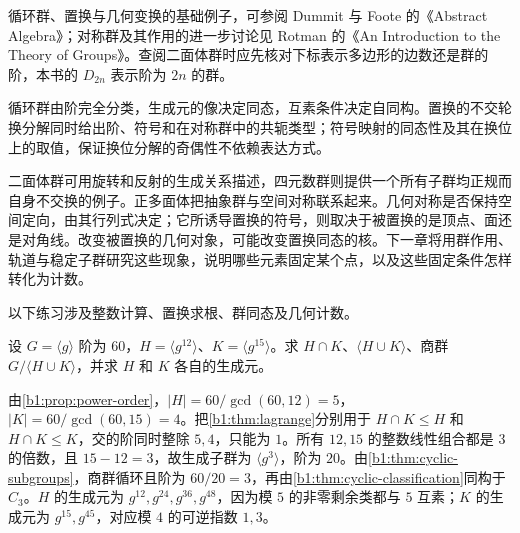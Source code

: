\ProseParagraphBreak
循环群、置换与几何变换的基础例子，可参阅 Dummit 与 Foote 的《Abstract Algebra》\cite[Sections 1.2--1.5, 2.3, 3.5]{DummitFoote2003}；对称群及其作用的进一步讨论见 Rotman 的《An Introduction to the Theory of Groups》\cite[Chapter 3]{Rotman1995TheoryGroups}。查阅二面体群时应先核对下标表示多边形的边数还是群的阶，本书的 \(D_{2n}\) 表示阶为 \(2n\) 的群。






\begin{chaptersummary}
	循环群由阶完全分类，生成元的像决定同态，互素条件决定自同构。置换的不交轮换分解同时给出阶、符号和在对称群中的共轭类型；符号映射的同态性及其在换位上的取值，保证换位分解的奇偶性不依赖表达方式。

	\ProseParagraphBreak
	二面体群可用旋转和反射的生成关系描述，四元数群则提供一个所有子群均正规而自身不交换的例子。正多面体把抽象群与空间对称联系起来。几何对称是否保持空间定向，由其行列式决定；它所诱导置换的符号，则取决于被置换的是顶点、面还是对角线。改变被置换的几何对象，可能改变置换同态的核。下一章将用群作用、轨道与稳定子群研究这些现象，说明哪些元素固定某个点，以及这些固定条件怎样转化为计数。
\end{chaptersummary}

\BookExercises

以下练习涉及整数计算、置换求根、群同态及几何计数。

\begin{exercise}\label{b1:ex:03-cyclic-sixty}
	设 \(G=\langle g\rangle\) 阶为 \(60\)，\(H=\langle g^{12}\rangle\)、\(K=\langle g^{15}\rangle\)。求 \(H\cap K\)、\(\langle H\cup K\rangle\)、商群 \(G/\langle H\cup K\rangle\)，并求 \(H\) 和 \(K\) 各自的生成元。
\end{exercise}
\begin{solution}
	由\cref{b1:prop:power-order}，\(\lvert H\rvert=60/\gcd(60,12)=5\)，\(\lvert K\rvert=60/\gcd(60,15)=4\)。把\cref{b1:thm:lagrange}分别用于 \(H\cap K\leq H\) 和 \(H\cap K\leq K\)，交的阶同时整除 \(5,4\)，只能为 \(1\)。所有 \(12,15\) 的整数线性组合都是 \(3\) 的倍数，且 \(15-12=3\)，故生成子群为 \(\langle g^3\rangle\)，阶为 \(20\)。由\cref{b1:thm:cyclic-subgroups}，商群循环且阶为 \(60/20=3\)，再由\cref{b1:thm:cyclic-classification}同构于 \(C_3\)。\(H\) 的生成元为 \(g^{12},g^{24},g^{36},g^{48}\)，因为模 \(5\) 的非零剩余类都与 \(5\) 互素；\(K\) 的生成元为 \(g^{15},g^{45}\)，对应模 \(4\) 的可逆指数 \(1,3\)。
\end{solution}

